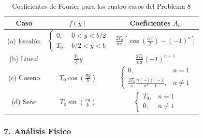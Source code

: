\documentclass[a4paper]{article}
\begin{document}
\begin{table}[h]
\centering
\begin{tabular}{|c|c|c|}
\hline
\textbf{Caso} & \textbf{$f(y)$} & \textbf{Coeficientes $A_n$} \\
\hline
(a) Escalón & $\begin{cases} 0, & 0 < y < b/2 \\ T_0, & b/2 < y < b \end{cases}$ & $\frac{2T_0}{n\pi} \left[ \cos\left(\frac{n\pi}{2}\right) - (-1)^n \right]$ \\
\hline
(b) Lineal & $\frac{T_0}{b} y$ & $\frac{2T_0}{n\pi} (-1)^{n+1}$ \\
\hline
(c) Coseno & $T_0 \cos\left(\frac{\pi y}{b}\right)$ & $\begin{cases} 0, & n = 1 \\ \frac{2T_0}{\pi} \frac{n(-1)^n - 1}{n^2 - 1}, & n \neq 1 \end{cases}$ \\
\hline
(d) Seno & $T_0 \sin\left(\frac{\pi y}{b}\right)$ & $\begin{cases} T_0, & n = 1 \\ 0, & n \neq 1 \end{cases}$ \\
\hline
\end{tabular}
\caption{Coeficientes de Fourier para los cuatro casos del Problema 8}
\end{table}

\subsubsection{7. Análisis Físico}
\end{document}

